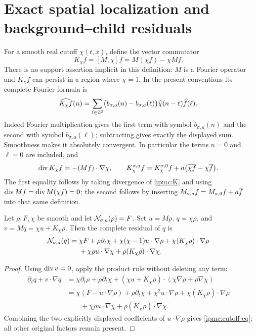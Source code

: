 \section{Exact spatial localization and background--child residuals}
For a smooth real cutoff $\chi(t,x)$, define the vector commutator
\begin{equation}\label{ipmc:K}
K_\chi f=[M,\chi]f=M(\chi f)-\chi Mf.
\end{equation}
There is no support assertion implicit in this definition: $M$ is a Fourier
operator and $K_\chi f$ can persist in a region where $\chi=1$.
In the present conventions its complete Fourier formula is
\begin{equation}\label{ipmc:K-Fourier}
\widehat{K_\chi f}(n)
=\sum_{\ell\in\mathbb Z^2}
\bigl(b_{\sigma,a}(n)-b_{\sigma,a}(\ell)\bigr)
\widehat\chi(n-\ell)\widehat f(\ell).
\end{equation}
Indeed Fourier multiplication gives the first term with symbol
$b_{\sigma,a}(n)$ and the second with symbol $b_{\sigma,a}(\ell)$;
subtracting gives exactly the displayed sum. Smoothness makes it absolutely
convergent. In particular the terms $n=0$ and $\ell=0$ are included, and
\begin{equation}\label{ipmc:K-div}
\operatorname{div} K_\chi f=-(Mf)\cdot\nabla\chi,
\qquad
K^{\sigma,a}_\chi f=K^{\sigma,0}_\chi f
+a\bigl(\overline{\chi f}-\chi\overline{f}\bigr).
\end{equation}
The first equality follows by taking divergence of \eqref{ipmc:K} and using
$\operatorname{div} Mf=\operatorname{div} M(\chi f)=0$; the second follows by inserting
$M_{\sigma,a}f=M_{\sigma,0}f+a\overline{f}$ into that same definition.

\begin{proposition}\label{ipmc:cutoff}
Let $\rho,F,\chi$ be smooth and let $\mathcal N_{\sigma,a}(\rho)=F$.
Set $u=M\rho$, $q=\chi\rho$, and $v=Mq=\chi u+K_\chi\rho$.
Then the complete residual of $q$ is
\begin{align}\label{ipmc:cutoff-eq}
\mathcal N_{\sigma,a}(q)
={}&\chi F+\rho\partial_t\chi
+\chi(\chi-1)u\cdot\nabla\rho
+\chi(K_\chi\rho)\cdot\nabla\rho\\
&+\chi\rho u\cdot\nabla\chi
+\rho(K_\chi\rho)\cdot\nabla\chi.\notag
\end{align}
\end{proposition}
\begin{proof}
Using $\operatorname{div} v=0$, apply the product rule without deleting any term:
\begin{align*}
\partial_tq+v\cdot\nabla q
&=\chi\partial_t\rho+\rho\partial_t\chi
+(\chi u+K_\chi\rho)\cdot(\chi\nabla\rho+\rho\nabla\chi)\\
&=\chi(F-u\cdot\nabla\rho)+\rho\partial_t\chi
+\chi^2u\cdot\nabla\rho+\chi(K_\chi\rho)\cdot\nabla\rho\\
&\qquad+\chi\rho u\cdot\nabla\chi+\rho(K_\chi\rho)\cdot\nabla\chi.
\end{align*}
Combining the two explicitly displayed coefficients of $u\cdot\nabla\rho$
gives \eqref{ipmc:cutoff-eq}; all other original factors remain present.
\end{proof}

